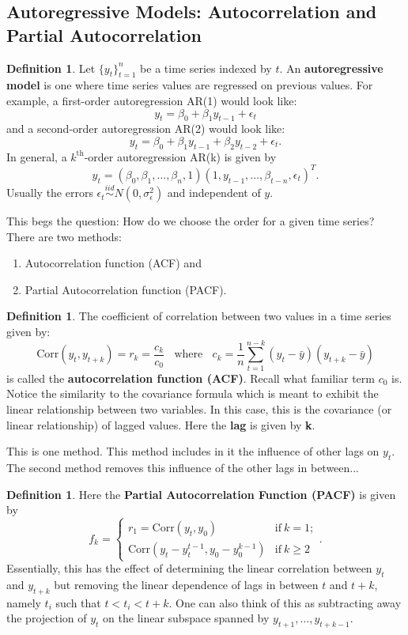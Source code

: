 \documentclass[12pt]{article}
\theoremstyle{definition}
\newtheorem{defn}[thm]{Definition}
\begin{document}
\subsection{Autoregressive Models:  Autocorrelation and Partial Autocorrelation}
\begin{defn}
Let $\{y_t\}_{t=1}^n$ be a time series indexed by $t$. An \textbf{autoregressive model} is one where time series values are regressed on previous values.  For example, a first-order autoregression AR(1) would look like:
\[ y_t = \beta_0 + \beta_1 y_{t-1} + \epsilon_t \]
and a second-order autoregression AR(2) would look like:
\[ y_t = \beta_0 + \beta_1 y_{t-1} + \beta_2 y_{t-2} + \epsilon_t. \]
In general, a $k^\text{th}$-order autoregression AR(k) is given by 
\[ y_t =  \left( \beta_0, \beta_1, \hdots, \beta_n, 1 \right) \left( 1, y_{t-1}, \hdots, \beta_{t-n}, \epsilon_t \right)^T. \]
Usually the errors $\epsilon_t \overset{iid}{\sim}N(0, \sigma_{\epsilon}^2)$ and independent of $y$.
\end{defn}

This begs the question:
How do we choose the order for a given time series?
There are two methods:
\begin{enumerate}
    \item Autocorrelation function (ACF) and
    \item Partial Autocorrelation function (PACF).
\end{enumerate}
\begin{defn}
The coefficient of correlation between two values in a time series given by:
\[ \text{Corr}(y_t, y_{t+k}) = r_k = \frac{c_k}{c_0} ~~~~\text{where}~~~~
c_k = \frac{1}{n} \sum_{t=1}^{n-k} (y_t - \bar{y})(y_{t+k} - \bar{y}) \]
is called the \textbf{autocorrelation function (ACF)}.
Recall what familiar term $c_0$ is.  Notice the similarity to the covariance formula which is meant to exhibit the linear relationship between two variables.  In this case, this is the covariance (or linear relationship) of lagged values.  Here the \textbf{lag} is given by \textbf{k}.
\end{defn}

This is one method.  This method includes in it the influence of other lags on $y_t$.  The second method removes this influence of the other lags in between...
\begin{defn}
Here the \textbf{Partial Autocorrelation Function (PACF)} is given by
\[ f_k = 
\begin{cases} 
      r_1 = \text{Corr}(y_t, y_0) & \text{if}~ k=1; \\
      \text{Corr}(y_t - y_t^{t-1}, y_0 - y_0^{k-1}) & \text{if}~ k \geq 2
   \end{cases}.
\]
Essentially, this has the effect of determining the linear correlation between $y_t$ and $y_{t+k}$ but removing the linear dependence of lags in between $t$ and $t+k$, namely $t_i$ such that $t < t_i < t+k$.  One can also think of this as subtracting away the projection of $y_t$ on the linear subspace spanned by $y_{t+1}, \hdots, y_{t+k-1}$.
\end{defn}
\end{document}
